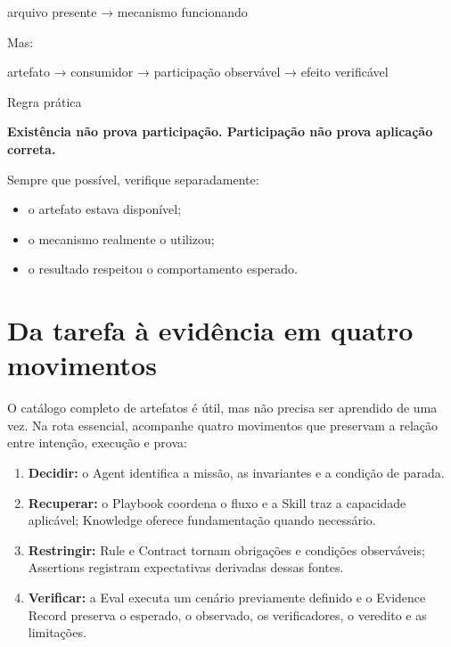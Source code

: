 \documentclass[
  10pt,
  a4paper,
  oneside]{book}
\newenvironment{Shaded}{}{}
\newcommand{\NormalTok}[1]{#1}
\providecommand{\tightlist}{%
  \setlength{\itemsep}{0pt}\setlength{\parskip}{0pt}}
\renewenvironment{Shaded}{\begin{snugshade}}{\end{snugshade}}%
\begin{document}
\begin{Shaded}
\begin{Highlighting}[]
\NormalTok{arquivo presente}
\NormalTok{→ mecanismo funcionando}
\end{Highlighting}
\end{Shaded}

Mas:

\begin{Shaded}
\begin{Highlighting}[]
\NormalTok{artefato}
\NormalTok{→ consumidor}
\NormalTok{→ participação observável}
\NormalTok{→ efeito verificável}
\end{Highlighting}
\end{Shaded}

\begin{tipbox}{Regra prática}

\textbf{Existência não prova participação. Participação não prova
aplicação correta.}

Sempre que possível, verifique separadamente:

\begin{itemize}
\tightlist
\item
  o artefato estava disponível;
\item
  o mecanismo realmente o utilizou;
\item
  o resultado respeitou o comportamento esperado.
\end{itemize}

\end{tipbox}

\hypertarget{da-tarefa-uxe0-eviduxeancia-em-quatro-movimentos}{%
\section{Da tarefa à evidência em quatro
movimentos}\label{da-tarefa-uxe0-eviduxeancia-em-quatro-movimentos}}

O catálogo completo de artefatos é útil, mas não precisa ser aprendido
de uma vez. Na rota essencial, acompanhe quatro movimentos que preservam
a relação entre intenção, execução e prova:

\begin{enumerate}
\def\labelenumi{\arabic{enumi}.}
\tightlist
\item
  \textbf{Decidir:} o Agent identifica a missão, as invariantes e a
  condição de parada.
\item
  \textbf{Recuperar:} o Playbook coordena o fluxo e a Skill traz a
  capacidade aplicável; Knowledge oferece fundamentação quando
  necessário.
\item
  \textbf{Restringir:} Rule e Contract tornam obrigações e condições
  observáveis; Assertions registram expectativas derivadas dessas
  fontes.
\item
  \textbf{Verificar:} a Eval executa um cenário previamente definido e o
  Evidence Record preserva o esperado, o observado, os verificadores, o
  veredito e as limitações.
\end{enumerate}
\end{document}
